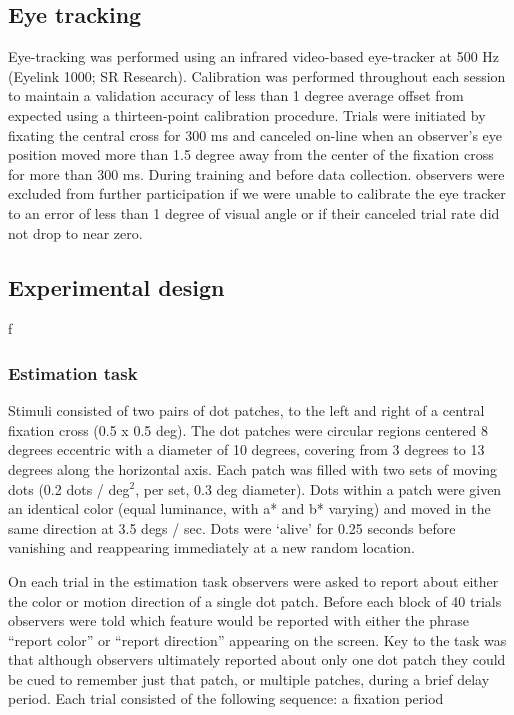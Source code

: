 \documentclass{report}
\begin{document}
\subsection{Eye tracking}

Eye-tracking was performed using an infrared video-based eye-tracker at 500 Hz (Eyelink 1000; SR Research). Calibration was performed throughout each session to maintain a validation accuracy of less than 1 degree average offset from expected using a thirteen-point calibration procedure. Trials were initiated by fixating the central cross for 300 ms and canceled on-line when an observer’s eye position moved more than 1.5 degree away from the center of the fixation cross for more than 300 ms. During training and before data collection. observers were excluded from further participation if we were unable to calibrate the eye tracker to an error of less than 1 degree of visual angle or if their canceled trial rate did not drop to near zero.

\subsection{Experimental design}
f
\subsubsection{Estimation task}

Stimuli consisted of two pairs of dot patches, to the left and right of a central fixation cross (0.5 x 0.5 deg). The dot patches were circular regions centered 8 degrees eccentric with a diameter of 10 degrees, covering from 3 degrees to 13 degrees along the horizontal axis. Each patch was filled with two sets of moving dots (0.2 dots / deg$^2$, per set, 0.3 deg diameter). Dots within a patch were given an identical color (equal luminance, with a* and b* varying) and moved in the same direction at 3.5 degs / sec. Dots were `alive' for 0.25 seconds before vanishing and reappearing immediately at a new random location.

On each trial in the estimation task observers were asked to report about either the color or motion direction of a single dot patch. Before each block of 40 trials observers were told which feature would be reported with either the phrase ``report color'' or ``report direction'' appearing on the screen. Key to the task was that although observers ultimately reported about only one dot patch they could be cued to remember just that patch, or multiple patches, during a brief delay period. Each trial consisted of the following sequence: a fixation period
\end{document}
